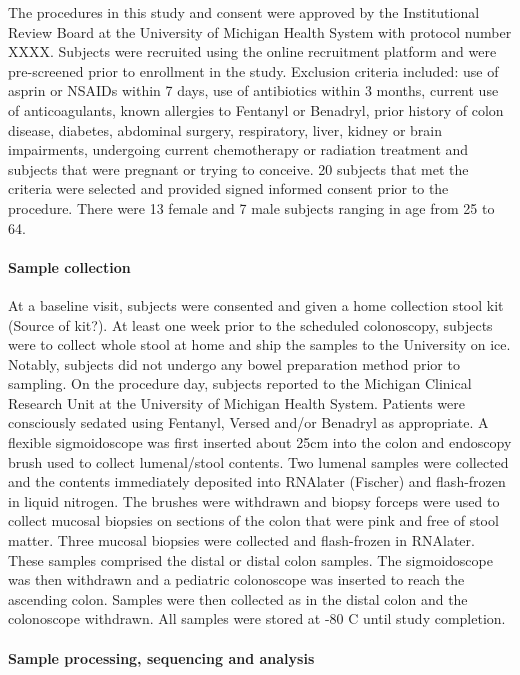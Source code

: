 \documentclass[11pt,]{article}
\let\oldparagraph\paragraph
\renewcommand{\paragraph}[1]{\oldparagraph{#1}\mbox{}}
\begin{document}
The procedures in this study and consent were approved by the
Institutional Review Board at the University of Michigan Health System
with protocol number XXXX. Subjects were recruited using the online
recruitment platform and were pre-screened prior to enrollment in the
study. Exclusion criteria included: use of asprin or NSAIDs within 7
days, use of antibiotics within 3 months, current use of anticoagulants,
known allergies to Fentanyl or Benadryl, prior history of colon disease,
diabetes, abdominal surgery, respiratory, liver, kidney or brain
impairments, undergoing current chemotherapy or radiation treatment and
subjects that were pregnant or trying to conceive. 20 subjects that met
the criteria were selected and provided signed informed consent prior to
the procedure. There were 13 female and 7 male subjects ranging in age
from 25 to 64.

\paragraph{Sample collection}\label{sample-collection}

At a baseline visit, subjects were consented and given a home collection
stool kit (Source of kit?). At least one week prior to the scheduled
colonoscopy, subjects were to collect whole stool at home and ship the
samples to the University on ice. Notably, subjects did not undergo any
bowel preparation method prior to sampling. On the procedure day,
subjects reported to the Michigan Clinical Research Unit at the
University of Michigan Health System. Patients were consciously sedated
using Fentanyl, Versed and/or Benadryl as appropriate. A flexible
sigmoidoscope was first inserted about 25cm into the colon and endoscopy
brush used to collect lumenal/stool contents. Two lumenal samples were
collected and the contents immediately deposited into RNAlater (Fischer)
and flash-frozen in liquid nitrogen. The brushes were withdrawn and
biopsy forceps were used to collect mucosal biopsies on sections of the
colon that were pink and free of stool matter. Three mucosal biopsies
were collected and flash-frozen in RNAlater. These samples comprised the
distal or distal colon samples. The sigmoidoscope was then withdrawn and
a pediatric colonoscope was inserted to reach the ascending colon.
Samples were then collected as in the distal colon and the colonoscope
withdrawn. All samples were stored at -80 C until study completion.

\paragraph{Sample processing, sequencing and
analysis}\label{sample-processing-sequencing-and-analysis}
\end{document}
